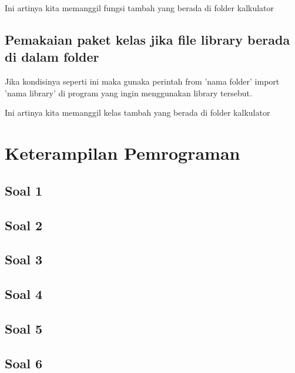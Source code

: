 \documentclass[12pt, times new roman]{report}
\begin{document}


\hspace{0.5cm} Ini artinya kita memanggil fungsi tambah yang berada di folder kalkulator

\section{Pemakaian paket kelas jika file library berada di dalam folder}
\hspace{1cm} Jika kondisinya seperti ini maka gunaka perintah from 'nama folder' import 'nama library' di program yang ingin menggunakan library tersebut.



\hspace{0.5cm} Ini artinya kita memanggil kelas tambah yang berada di folder kalkulator

\chapter{Keterampilan Pemrograman}

\section*{Soal 1}


\section*{Soal 2}


\section*{Soal 3}


\section*{Soal 4}


\section*{Soal 5}


\section*{Soal 6}

\end{document}
